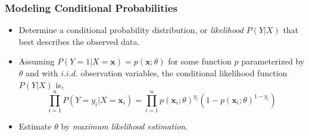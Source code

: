 \begin{frame}
\frametitle{Modeling Conditional Probabilities}
\begin{itemize}
\item Determine a conditional probability distribution, or \textit{likelihood} $P(Y|X)$ that best describes the observed data.
\item Assuming $P(Y=1|X=\mathbf{x}) = p(\mathbf{x};\theta)$ for some function $p$ parameterized by $\theta$ and with $i.i.d.$ observation variables, the conditional likelihood function $P(Y|X)$ is,
\begin{equation}
\prod_{i=1}^n P(Y=y_i|X=\mathbf{x}_i) = \prod_{i=1}^n p(\mathbf{x}_i;\theta)^{y_i} (1-p(\mathbf{x}_i;\theta)^{1-y_i})
\end{equation}
\item Estimate $\theta$ by \textit{maximum likelihood estimation}.  
\end{itemize}
\end{frame}
